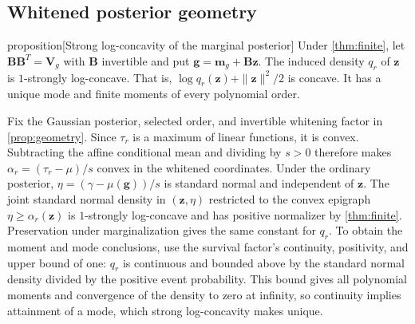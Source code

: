 \subsection{Whitened posterior geometry}
\begin{theoremEnd}[normal,category=geometry]{proposition}[Strong log-concavity of the marginal posterior]
\label{prop:geometry}
Under \cref{thm:finite}, let
$\boldsymbol B\boldsymbol B^T=\boldsymbol V_g$ with $\boldsymbol B$
invertible and put $\boldsymbol g=\boldsymbol m_g+\boldsymbol B\boldsymbol z$.
The induced density $q_r$ of $\boldsymbol z$ is $1$-strongly
log-concave. That is, $\log q_r(\boldsymbol z)+\|\boldsymbol z\|^2/2$
is concave. It has a unique mode and finite moments of every
polynomial order.
\end{theoremEnd}
\begin{proofEnd}
Fix the Gaussian posterior, selected order, and invertible whitening
factor in \cref{prop:geometry}. Since $\tau_r$ is a maximum of
linear functions, it is convex. Subtracting the affine conditional
mean and dividing by $s>0$ therefore makes
$\alpha_r=(\tau_r-\mu)/s$ convex in the whitened coordinates.
Under the ordinary posterior,
$\eta=(\gamma-\mu(\boldsymbol g))/s$ is standard normal and independent
of $\boldsymbol z$. The joint standard normal density in
$(\boldsymbol z,\eta)$ restricted to the convex epigraph
$\eta\geq\alpha_r(\boldsymbol z)$ is $1$-strongly log-concave and
has positive normalizer by \cref{thm:finite}.
Preservation under marginalization
\citep[Theorem 3.8]{saumard2014logconcavity} gives the same constant
for $q_r$.
To obtain the moment and mode conclusions, use the survival factor's
continuity, positivity, and upper bound of one:
$q_r$ is continuous and bounded above by the standard normal density
divided by the positive event probability. This bound gives all
polynomial moments and convergence of the density to zero at infinity,
so continuity implies attainment of a mode, which strong
log-concavity makes unique.
\end{proofEnd}
